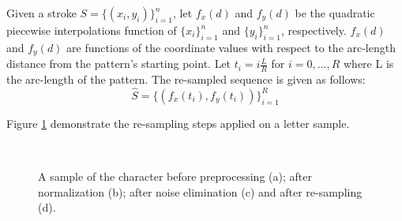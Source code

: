 \iftoggle{edit-mode}{\hspace{0pt}\marginpar{Approach}}{}
Given a stroke $S=\{(x_i,y_i)\}_{i=1}^{n}$, let $f_{x}(d)$ and $f_{y}(d)$ be the quadratic piecewise interpolations function of $\{x_i\}_{i=1}^{n}$ and $\{y_i\}_{i=1}^{n}$, respectively. 
$f_{x}(d)$ and $f_{y}(d)$ are functions of the coordinate values with respect to the arc-length distance from the pattern's starting point. 
Let $t_i=i\frac{L}{R}$ for $i=0,...,R$ where L is the arc-length of the pattern.
The re-sampled sequence is given as follows:
\begin{equation}
\widehat{S}=\{(f_x(t_i),f_y(t_i))\}_{i=1}^{R}
\end{equation}

Figure \ref{fig:before_after_preprocessing} demonstrate the re-sampling steps applied on a letter sample.

\begin{figure}
	\centering
          \\
    \caption{A sample of the character  before preprocessing (a); after normalization (b); after noise elimination (c) and after re-sampling (d).}
   \label{fig:before_after_preprocessing}
\end{figure}


